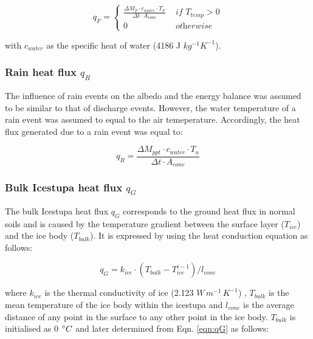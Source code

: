 \begin{equation}
	q_{F} = \left\{ \begin{array}{ll}
		\frac{ \Delta M_F \cdot c_{water} \cdot T_F}{\Delta t \cdot A_{cone}} & \textit{ if } T_{temp} > 0 \\
		0   & \textit{ otherwise}
	\end{array} \right.
\end{equation}

with $c_{water}$ as the specific heat of water (4186 J $kg^{-1} K^{-1}$).

\subsubsection{Rain heat flux \texorpdfstring{$q_{R}$}{Lg} }

The influence of rain events on the albedo and the energy balance was assumed to be similar to that of discharge
events. However, the water temperature of a rain event was assumed to equal to the air temeperature. Accordingly,
the heat flux generated due to a rain event was equal to:

\begin{equation}
  q_{R} = \frac{ \Delta M_{ppt} \cdot c_{water} \cdot T_a}{\Delta t \cdot A_{cone}}
	\label{eqn:qR}
\end{equation}

\subsubsection{Bulk Icestupa heat flux \texorpdfstring{$q_{G}$}{Lg}} \label{sec:Bulkflux}

The bulk Icestupa heat flux $q_{G}$ corresponds to the ground heat flux in normal soils and is caused by the
temperature gradient between the surface layer ($T_{ice}$) and the ice body ($T_{bulk}$). It is expressed by
using the heat conduction equation as follows:

\begin{equation} q_{G} = k_{ice} \cdot (T_{bulk}-T_{ice}^{i-1})/l_{cone} \label{eqn:qG}    \end{equation}

where $k_{ice}$ is the thermal conductivity of ice (2.123 $W\, m^{-1}\,K^{-1}$) , $T_{bulk}$ is the mean
temperature of the ice body within the icestupa and $l_{cone}$ is the average distance of any point in the
surface to any other point in the ice body. $T_{bulk}$ is initialised as 0 $^{\circ} C$ and later determined from
Eqn. \ref{eqn:qG} as follows:

